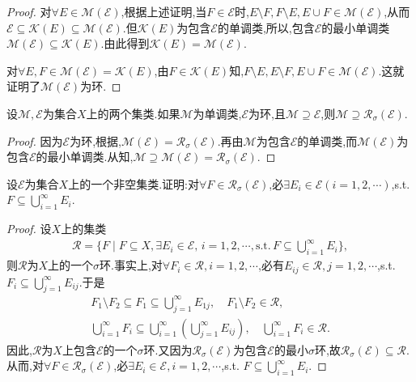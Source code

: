 \documentclass[../../main.tex]{subfiles}%
\begin{document}
\begin{proof}
对$\forall E \in \mathscr{M}(\mathscr{E})$,根据上述证明,当$F \in \mathscr{E}$时,$E \setminus F, F \setminus E, E \cup F \in \mathscr{M}(\mathscr{E})$,从而$\mathscr{E} \subseteq \mathscr{K}(E) \subseteq \mathscr{M}(\mathscr{E})$.但$\mathscr{K}(E)$为包含$\mathscr{E}$的单调类,所以,包含$\mathscr{E}$的最小单调类$\mathscr{M}(\mathscr{E}) \subseteq \mathscr{K}(E)$.由此得到$\mathscr{K}(E) = \mathscr{M}(\mathscr{E})$.

对$\forall E,F \in \mathscr{M}(\mathscr{E}) = \mathscr{K}(E)$,由$F \in \mathscr{K}(E)$知,$F \setminus E, E \setminus F, E \cup F \in \mathscr{M}(\mathscr{E})$.这就证明了$\mathscr{M}(\mathscr{E})$为环.
\end{proof}

\begin{corollary}
设$\mathscr{M},\mathscr{E}$为集合$X$上的两个集类.如果$\mathscr{M}$为单调类,$\mathscr{E}$为环,且$\mathscr{M} \supseteq \mathscr{E}$,则$\mathscr{M} \supseteq \mathscr{R}_\sigma(\mathscr{E})$.
\end{corollary}

\begin{proof}
因为$\mathscr{E}$为环,根据,$\mathscr{M}(\mathscr{E}) = \mathscr{R}_\sigma(\mathscr{E})$.再由$\mathscr{M}$为包含$\mathscr{E}$的单调类,而$\mathscr{M}(\mathscr{E})$为包含$\mathscr{E}$的最小单调类.从知,$\mathscr{M} \supseteq \mathscr{M}(\mathscr{E}) = \mathscr{R}_\sigma(\mathscr{E})$.
\end{proof}

\begin{example}
设$\mathscr{E}$为集合$X$上的一个非空集类.证明:对$\forall F \in \mathscr{R}_\sigma(\mathscr{E})$,必$\exists E_i \in \mathscr{E}(i=1,2,\cdots)$,s.t. $F \subseteq \bigcup_{i=1}^{\infty} E_i$.
\end{example}

\begin{proof}
设$X$上的集类
\begin{align*}
\mathscr{R} = \{F \mid F \subseteq X, \exists E_i \in \mathscr{E}, \, i=1,2,\cdots,\text{s.t.} \, F \subseteq \bigcup_{i=1}^{\infty} E_i\},
\end{align*}
则$\mathscr{R}$为$X$上的一个$\sigma$环.事实上,对$\forall F_i \in \mathscr{R},i=1,2,\cdots$,必有$E_{ij} \in \mathscr{R},j=1,2,\cdots$,s.t. $F_i \subseteq \bigcup_{j=1}^{\infty} E_{ij}$.于是
\begin{align*}
F_1 \setminus F_2 \subseteq F_1 \subseteq \bigcup_{j=1}^{\infty} E_{1j}, \quad F_1 \setminus F_2 \in \mathscr{R}, \\
\bigcup_{i=1}^{\infty} F_i \subseteq \bigcup_{i=1}^{\infty} \left( \bigcup_{j=1}^{\infty} E_{ij} \right), \quad \bigcup_{i=1}^{\infty} F_i \in \mathscr{R}.
\end{align*}
因此,$\mathscr{R}$为$X$上包含$\mathscr{E}$的一个$\sigma$环.又因为$\mathscr{R}_\sigma(\mathscr{E})$为包含$\mathscr{E}$的最小$\sigma$环,故$\mathscr{R}_\sigma(\mathscr{E}) \subseteq \mathscr{R}$.从而,对$\forall F \in \mathscr{R}_\sigma(\mathscr{E})$,必$\exists E_i \in \mathscr{E},i=1,2,\cdots$,s.t. $F \subseteq \bigcup_{i=1}^{\infty} E_i$.
\end{proof}
\end{document}
